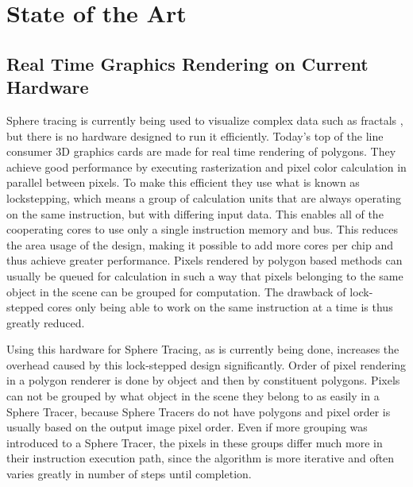 \chapter{State of the Art}

	\section{ Real Time Graphics Rendering on Current Hardware } 

		Sphere tracing is currently being used to visualize complex data such
		as fractals \cite{granskog2017}, but there is no hardware designed to
		run it efficiently.  Today's top of the line consumer 3D graphics cards
		are made for real time rendering of polygons. They achieve good
		performance by executing rasterization and pixel color calculation in
		parallel between pixels. To make this efficient they use what is known
		as lockstepping, which means a group of calculation units that are
		always operating on the same instruction, but with differing input
		data. This enables all of the cooperating cores to use only a single
		instruction memory and bus. This reduces the area usage of the design,
		making it possible to add more cores per chip and thus achieve greater
		performance. Pixels rendered by polygon based methods can usually be
		queued for calculation in such a way that pixels belonging to the same
		object in the scene can be grouped for computation. The drawback of
		lock-stepped cores only being able to work on the same instruction at a
		time is thus greatly reduced.
		
		Using this hardware for Sphere Tracing, as is currently being done,
		increases the overhead caused by this lock-stepped design
		significantly. Order of pixel rendering in a polygon renderer is done
		by object and then by constituent polygons. Pixels can not be grouped
		by what object in the scene they belong to as easily in a Sphere
		Tracer, because Sphere Tracers do not have polygons and pixel order is
		usually based on the output image pixel order. Even if more grouping
		was introduced to a Sphere Tracer, the pixels in these groups differ
		much more in their instruction execution path, since the algorithm is
		more iterative and often varies greatly in number of steps until
		completion.


